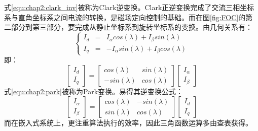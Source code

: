 式\ref{equ:chap2:clark_inv}被称为Clark逆变换。Clark正逆变换完成了交流三相坐标系与直角坐标系之间电流的转换，是磁场定向控制的基础。而在图\ref{fig:FOC}的第二部分到第三部分，要完成从静止坐标系到旋转坐标系的变换。由几何关系有：
$$
  \left\{
  \begin{aligned}
  I_d & = & I_\alpha cos(\lambda)+I_\beta sin(\lambda) \\
  I_q & = & -I_\alpha sin(\lambda)+I_\beta cos(\lambda)
  \end{aligned}
  \right.
$$
即：
\begin{equation}
  \label{equ:chap2:park}
  \left[ \begin{array}{c}
  I_d \\
  I_q
  \end{array}
  \right]=\left[ 
    \begin{array}{cc}
    cos(\lambda) & sin(\lambda)\\
    -sin(\lambda) & cos(\lambda)   
    \end{array}
    \right]\left[ \begin{array}{c}
      I_\alpha \\
      I_\beta
      \end{array}
      \right]
\end{equation}
式\ref{equ:chap2:park}被称为Park变换。易得其逆变换公式：
\begin{equation}
  \label{equ:chap2:park_inv}
  \left[ \begin{array}{c}
  I_\alpha \\
  I_\beta
  \end{array}
  \right]=\left[ 
    \begin{array}{cc}
    cos(\lambda) & -sin(\lambda)\\
    sin(\lambda) & cos(\lambda)   
    \end{array}
    \right]\left[ \begin{array}{c}
      I_d \\
      I_q
      \end{array}
      \right]
\end{equation}
而在嵌入式系统上，更注重算法执行的效率，因此三角函数运算多由查表获得。
